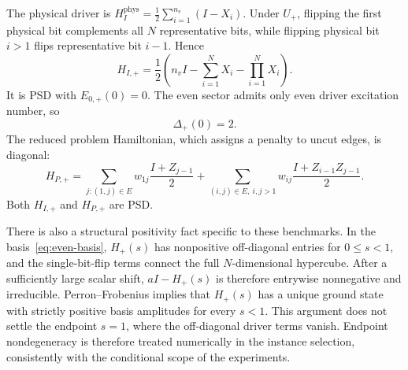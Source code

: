 \documentclass[11pt, a4paper]{article}
\begin{document}
The physical driver is $H_I^{\mathrm{phys}}=\frac12\sum_{i=1}^{n_v}(I-X_i)$. Under $U_+$, flipping the first physical bit complements all $N$ representative bits, while flipping physical bit $i>1$ flips representative bit $i-1$. Hence
\begin{equation}
H_{I,+}=\frac12\left(n_vI-\sum_{i=1}^NX_i-\prod_{i=1}^NX_i\right).
\end{equation}
It is PSD with $E_{0,+}(0)=0$. The even sector admits only even driver excitation number, so
\begin{equation}
\Delta_+(0)=2.
\end{equation}
The reduced problem Hamiltonian, which assigns a penalty to uncut edges, is diagonal:
\begin{equation}
H_{P,+}=\sum_{j:(1,j)\in E}w_{1j}\frac{I+Z_{j-1}}{2}
+\sum_{(i,j)\in E,\ i,j>1}w_{ij}\frac{I+Z_{i-1}Z_{j-1}}{2}.
\end{equation}
Both $H_{I,+}$ and $H_{P,+}$ are PSD.

There is also a structural positivity fact specific to these benchmarks. In the basis~\eqref{eq:even-basis}, $H_+(s)$ has nonpositive off-diagonal entries for $0\le s<1$, and the single-bit-flip terms connect the full $N$-dimensional hypercube. After a sufficiently large scalar shift, $aI-H_+(s)$ is therefore entrywise nonnegative and irreducible. Perron--Frobenius implies that $H_+(s)$ has a unique ground state with strictly positive basis amplitudes for every $s<1$. This argument does not settle the endpoint $s=1$, where the off-diagonal driver terms vanish. Endpoint nondegeneracy is therefore treated numerically in the instance selection, consistently with the conditional scope of the experiments.
\end{document}
